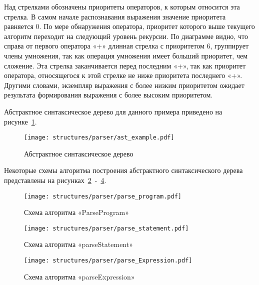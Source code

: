 Над стрелками обозначены приоритеты операторов, к которым относится эта стрелка.
В самом начале распознавания выражения значение приоритета равняется 0.
По мере обнаружения оператора, приоритет которого выше текущего алгоритм переходит на следующий уровень рекурсии.
По диаграмме видно, что справа от первого оператора «+» длинная стрелка с приоритетом 6, группирует члены умножения, так как операция умножения имеет больший приоритет, чем сложение.
Эта стрелка заканчивается перед последним «+», так как приоритет оператора, относящегося к этой стрелке не ниже приоритета последнего «+».
Другими словами, экземпляр выражения с более низким приоритетом ожидает результата формирования выражения с более высоким приоритетом.

Абстрактное синтаксическое дерево для данного примера приведено на рисунке~\ref{f:ast_example}.

\begin{figure}[ht]
	\centering
	\vspace{\toppaddingoffigure}
	\texttt{[image: structures/parser/ast\_example.pdf]}
	\caption{Абстрактное синтаксическое дерево}
	\label{f:ast_example}
\end{figure}

Некоторые схемы алгоритма построения абстрактного синтаксического дерева представлены на рисунках~\ref{f:parse_program}~-~\ref{f:parse_Expression}.


\clearpage

\begin{figure}[!htp]
	\centering
	\texttt{[image: structures/parser/parse\_program.pdf]}
	\caption{Схема алгоритма «ParseProgram»}
	\label{f:parse_program}
\end{figure}

\clearpage

\begin{figure}[!htp]
	\centering
	\texttt{[image: structures/parser/parse\_statement.pdf]}
	\caption{Схема алгоритма «parseStatement»}
	\label{f:parse_statement}
\end{figure}

\clearpage

\begin{figure}[!htp]
	\centering
	\texttt{[image: structures/parser/parse\_Expression.pdf]}
	\caption{Схема алгоритма «parseExpression»}
	\label{f:parse_Expression}
\end{figure}

\clearpage

